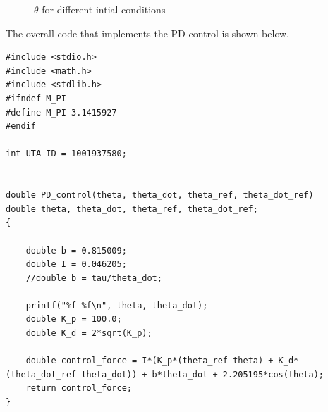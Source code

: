 \documentclass[12pt]{article}
\begin{document}
\begin{figure}[h]
	
	\begin{minipage}{.5\linewidth}
		\centering
	\end{minipage}%
	\begin{minipage}{.5\linewidth}
		\centering
	\end{minipage}\par\medskip
	
	\caption{${\theta}$ for different intial conditions}
	\label{fig3}
\end{figure}

The overall code that implements the PD control is shown below. 
	
\begin{lstlisting}[style=CStyle]
#include <stdio.h>
#include <math.h>
#include <stdlib.h>
#ifndef M_PI
#define M_PI 3.1415927
#endif

int UTA_ID = 1001937580;


double PD_control(theta, theta_dot, theta_ref, theta_dot_ref)
double theta, theta_dot, theta_ref, theta_dot_ref;
{
	
	double b = 0.815009;
	double I = 0.046205;
	//double b = tau/theta_dot;
	
	printf("%f %f\n", theta, theta_dot);
	double K_p = 100.0;
	double K_d = 2*sqrt(K_p);
	
	double control_force = I*(K_p*(theta_ref-theta) + K_d*(theta_dot_ref-theta_dot)) + b*theta_dot + 2.205195*cos(theta);
	return control_force;
}


\end{lstlisting}	
\end{document}

